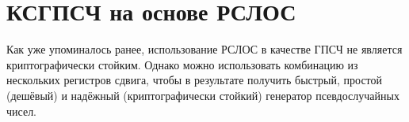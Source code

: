 







\section{КСГПСЧ на основе РСЛОС}

Как уже упоминалось ранее, использование РСЛОС в качестве ГПСЧ не является криптографически стойким. Однако можно использовать комбинацию из нескольких регистров сдвига, чтобы в результате получить быстрый, простой (дешёвый) и надёжный (криптографически стойкий) генератор псевдослучайных чисел.






